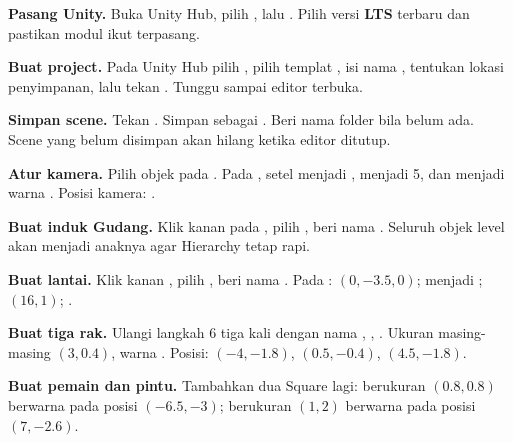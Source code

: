 \begin{langkah}
  \item \textbf{Pasang Unity.} Buka Unity Hub, pilih , lalu
        . Pilih versi \textbf{LTS} terbaru dan
        pastikan modul  ikut terpasang.

  \item \textbf{Buat project.} Pada Unity Hub pilih ,
        pilih templat , isi nama \NamaProject, tentukan lokasi
        penyimpanan, lalu tekan . Tunggu sampai editor
        terbuka.

  \item \textbf{Simpan scene.} Tekan . Simpan sebagai
        . Beri nama folder  bila
        belum ada. Scene yang belum disimpan akan hilang ketika editor
        ditutup.

  \item \textbf{Atur kamera.} Pilih objek  pada
        . Pada , setel
         menjadi ,  menjadi
        5, dan  menjadi warna . Posisi
        kamera: .

  \item \textbf{Buat induk Gudang.} Klik kanan pada , pilih
        , beri nama . Seluruh objek level
        akan menjadi anaknya agar Hierarchy tetap rapi.

  \item \textbf{Buat lantai.} Klik kanan , pilih
        , beri nama .
        Pada :  $(0,-3.5,0)$;
         menjadi ;
         $(16,1)$;  .

  \item \textbf{Buat tiga rak.} Ulangi langkah 6 tiga kali dengan nama
        , , . Ukuran masing-masing
        $(3,0.4)$, warna . Posisi:
        $(-4,-1.8)$, $(0.5,-0.4)$, $(4.5,-1.8)$.

  \item \textbf{Buat pemain dan pintu.} Tambahkan dua Square lagi:
         berukuran $(0.8,0.8)$ berwarna  pada
        posisi $(-6.5,-3)$;  berukuran $(1,2)$ berwarna
         pada posisi $(7,-2.6)$.


\end{langkah}

